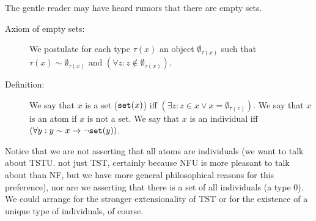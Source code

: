 \documentclass{slides}
\begin{document}
\begin{slide}

The gentle reader may have heard rumors that there are empty sets.

\begin{description}

\item[Axiom of empty sets:]  We postulate for each type $\tau(x)$ an object $\emptyset_{\tau(x)}$ such that $\tau(x) \sim \emptyset_{\tau(x)}$ and $(\forall z:z \not\in \emptyset_{\tau(x)})$.

\item[Definition:]  We say that $x$ is a set (${\tt set}(x)$) iff $(\exists z:z \in x \vee x = \emptyset_{\tau(z)})$.  We say that $x$ is an atom if $x$ is not a set.  We say that $x$ is an individual iff
$(\forall y:y \sim x \rightarrow \neg {\tt set}(y))$.

\end{description}

Notice that we are not asserting that all atoms are individuals (we want to talk about TSTU. not just TST, certainly because NFU is more pleasant to talk about than NF, but we have more general philosophical reasons for this preference), nor are we asserting
that there is a set of all individuals (a type 0).  We could arrange for the stronger extensionality of TST or for the existence of a unique type of individuals, of course.

\end{slide}
\end{document}
